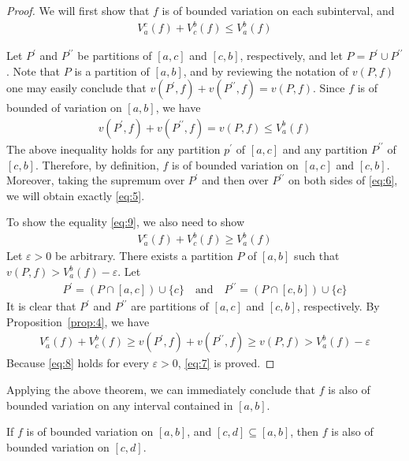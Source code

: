 \documentclass[thmcnt=section, color=blue, 12pt]{my-elegantbook}
\begin{document}
\begin{proof}
	We will first show that $f$ is of bounded variation on each subinterval, and
	\begin{align}
		V_a^c(f) + V_c^b(f) \leq V_a^b(f)
		\label{eq:5}
	\end{align}

	Let $P^\prime$ and $P^{\prime\prime}$ be partitions of $[a, c]$ and $[c, b]$,
	respectively,
	and let $P = P^\prime \cup P^{\prime\prime}$.
	Note that $P$ is a partition of $[a, b]$,
	and by reviewing the notation of $v(P, f)$
	one may easily conclude that $v(P^\prime, f) + v(P^{\prime\prime}, f) = v(P, f)$.
	Since $f$ is of bounded of variation on $[a, b]$, we have
	\begin{align}
		v(P^\prime, f) + v(P^{\prime\prime}, f) = v(P, f) \leq V_a^b (f)
		\label{eq:6}
	\end{align}
	The above inequality holds for any partition $p^\prime$ of $[a, c]$
	and any partition $P^{\prime\prime}$ of $[c, b]$.
	Therefore, by definition, $f$ is of bounded variation on $[a, c]$ and $[c, b]$.
	Moreover, taking the supremum over $P^\prime$ and then over $P^{\prime\prime}$
	on both sides of \eqref{eq:6}, we will obtain exactly \eqref{eq:5}.

	To show the equality \eqref{eq:9}, we also need to show
	\begin{align}
		V_a^c(f) + V_c^b(f) \geq V_a^b (f)
		\label{eq:7}
	\end{align}
	Let $\varepsilon > 0$ be arbitrary.
	There exists a partition $P$ of $[a, b]$
	such that $v(P, f) > V_a^b(f) - \varepsilon$.
	Let
	\begin{align*}
		P^\prime = ( P \cap [a, c] ) \cup \{c\} \quad \text{and} \quad
		P^{\prime\prime} = ( P \cap [c, b] ) \cup \{c\}
	\end{align*}
	It is clear that $P^\prime$ and $P^{\prime\prime}$
	are partitions of $[a, c]$ and $[c, b]$, respectively.
	By Proposition~\ref{prop:4}, we have
	\begin{align}
		V_a^c(f) + V_c^b(f) \geq v(P^\prime, f)
		+ v(P^{\prime\prime}, f)
		\geq v(P, f) > V_a^b(f) - \varepsilon
		\label{eq:8}
	\end{align}
	Because \eqref{eq:8} holds for every $\varepsilon > 0$, \eqref{eq:7} is proved.
\end{proof}

Applying the above theorem, we can immediately conclude that $f$
is also of bounded variation on any interval contained in $[a, b]$.

\begin{corollary} \label{cor:1}
	If $f$ is of bounded variation on $[a, b]$,
	and $[c, d] \subseteq [a, b]$,
	then $f$ is also of bounded variation on $[c, d]$.
\end{corollary}
\end{document}
